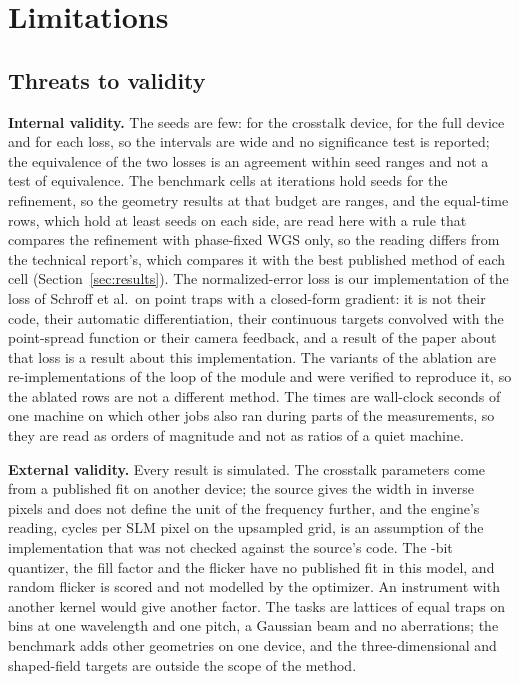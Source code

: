 \section{Limitations}\label{sec:limits}

\subsection{Threats to validity}

\textbf{Internal validity.} The seeds are few: \nSeedsOne{} for the crosstalk device, \nSeedsOneFull{} for the full device and \schroffXN{} for each loss, so the intervals are wide and no significance test is reported; the equivalence of the two losses is an agreement within seed ranges and not a test of equivalence. The benchmark cells at \benchOneBudget{} iterations hold \benchOneDevSeeds{} seeds for the refinement, so the geometry results at that budget are ranges, and the equal-time rows, which hold at least \benchOneWinMinSeeds{} seeds on each side, are read here with a rule that compares the refinement with phase-fixed WGS only, so the reading differs from the technical report's, which compares it with the best published method of each cell (Section~\ref{sec:results}). The normalized-error loss is our implementation of the loss of Schroff et al.\ on point traps with a closed-form gradient: it is not their code, their automatic differentiation, their continuous targets convolved with the point-spread function or their camera feedback, and a result of the paper about that loss is a result about this implementation. The variants of the ablation are re-implementations of the loop of the module and were verified to reproduce it, so the ablated rows are not a different method. The times are wall-clock seconds of one machine on which other jobs also ran during parts of the measurements, so they are read as orders of magnitude and not as ratios of a quiet machine.

\textbf{External validity.} Every result is simulated. The crosstalk parameters come from a published fit on another device; the source gives the width in inverse pixels and does not define the unit of the frequency further, and the engine's reading, cycles per SLM pixel on the upsampled grid, is an assumption of the implementation that was not checked against the source's code. The \parBits{}-bit quantizer, the fill factor and the flicker have no published fit in this model, and random flicker is scored and not modelled by the optimizer. An instrument with another kernel would give another factor. The tasks are lattices of equal traps on bins at one wavelength and one pitch, a Gaussian beam and no aberrations; the benchmark adds other geometries on one device, and the three-dimensional and shaped-field targets are outside the scope of the method.

